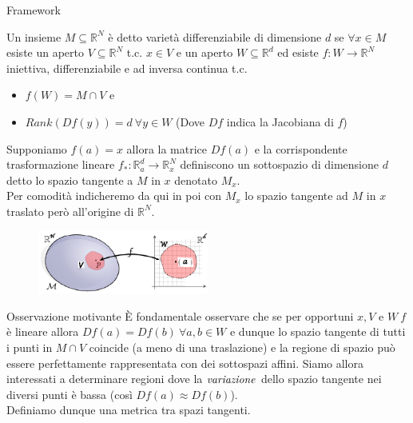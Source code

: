 \documentclass[usenames,dvipsnames,9pt]{beamer}
\newcommand{\RR}{\mathbb{R}}
\theoremstyle{definition}
\begin{document}
\begin{frame}{Framework}
\begin{definition}[Varietà]
Un insieme $M\subseteq\RR^{N}$ è detto varietà differenziabile di dimensione $d$ se $\forall x\in M$ esiste un aperto $V\subseteq\RR^{N}$ t.c. $x\in V$ e un aperto $W\subseteq\RR^d$ ed esiste $f:W\to\RR^{N}$ iniettiva, differenziabile e ad inversa continua t.c.
\begin{itemize}
  \item $f(W)=M\cap V$ e
  \item $Rank(Df(y)) = d\ \forall y\in W$ (Dove $Df$ indica la Jacobiana di $f$)
\end{itemize}
\end{definition}
Supponiamo $f(a)=x$ allora la matrice $Df(a)$ e la corrispondente trasformazione lineare $f_{*}:\RR^{d}_{a}\to \RR^{N}_{x}$ definiscono un sottospazio di dimensione $d$ detto lo spazio tangente a $M$ in $x$ denotato $M_{x}$. \\
Per comodità indicheremo da qui in poi con $M_x$ lo spazio tangente ad $M$ in $x$ traslato però all'origine di $\RR^N$.

\begin{figure}[b]
\centering
\includegraphics[width=0.5\textwidth]{graphics/manifold.eps}
\end{figure}
\end{frame}

\begin{frame}{Osservazione motivante}
È fondamentale osservare che se per opportuni $x, V$ e $W \ f$ è lineare allora $Df(a)=Df(b) \ \forall a, b\in W$ e dunque lo spazio tangente di tutti i punti in $M\cap V$ coincide (a meno di una traslazione) e la regione di spazio può essere perfettamente rappresentata con dei sottospazi affini.
Siamo allora interessati a determinare regioni dove la $\it{variazione}$ dello spazio tangente nei diversi punti è bassa (così $Df(a)\approx Df(b)$). \\
Definiamo dunque una metrica tra spazi tangenti.
\end{frame}
\end{document}
